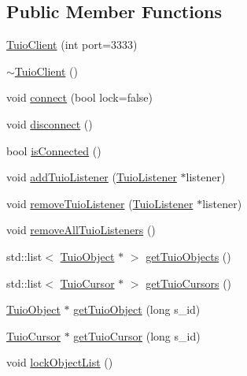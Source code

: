\subsection*{Public Member Functions}
\begin{DoxyCompactItemize}
\item 
\hyperlink{class_t_u_i_o_1_1_tuio_client_a5c270932c095fe9f88caef9a18864cfa}{Tuio\+Client} (int port=3333)
\item 
\hyperlink{class_t_u_i_o_1_1_tuio_client_a8d93ce8f2ed78b1430ac0904adcc1f73}{$\sim$\+Tuio\+Client} ()
\item 
void \hyperlink{class_t_u_i_o_1_1_tuio_client_affe2a075119d66e3047e29a5438c6af5}{connect} (bool lock=false)
\item 
void \hyperlink{class_t_u_i_o_1_1_tuio_client_a4c2291700e637ae6e1ceb55887003500}{disconnect} ()
\item 
bool \hyperlink{class_t_u_i_o_1_1_tuio_client_a6388e3149fd5c0a2da9d6aeeabf7d784}{is\+Connected} ()
\item 
void \hyperlink{class_t_u_i_o_1_1_tuio_client_a5edd6293d13a5e4cc31f734ede575241}{add\+Tuio\+Listener} (\hyperlink{class_t_u_i_o_1_1_tuio_listener}{Tuio\+Listener} $\ast$listener)
\item 
void \hyperlink{class_t_u_i_o_1_1_tuio_client_a0519f60177d5469b2438ca9f86b557fb}{remove\+Tuio\+Listener} (\hyperlink{class_t_u_i_o_1_1_tuio_listener}{Tuio\+Listener} $\ast$listener)
\item 
void \hyperlink{class_t_u_i_o_1_1_tuio_client_ad7fb92acb9a481aadb3620168e44735f}{remove\+All\+Tuio\+Listeners} ()
\item 
std\+::list$<$ \hyperlink{class_t_u_i_o_1_1_tuio_object}{Tuio\+Object} $\ast$ $>$ \hyperlink{class_t_u_i_o_1_1_tuio_client_ad9d968142e2e6d9639b685152ee2cf1b}{get\+Tuio\+Objects} ()
\item 
std\+::list$<$ \hyperlink{class_t_u_i_o_1_1_tuio_cursor}{Tuio\+Cursor} $\ast$ $>$ \hyperlink{class_t_u_i_o_1_1_tuio_client_a8df501baf8e635b931255a17873e590a}{get\+Tuio\+Cursors} ()
\item 
\hyperlink{class_t_u_i_o_1_1_tuio_object}{Tuio\+Object} $\ast$ \hyperlink{class_t_u_i_o_1_1_tuio_client_a11e2341d753f2acfa0c44fe57f63c92c}{get\+Tuio\+Object} (long s\+\_\+id)
\item 
\hyperlink{class_t_u_i_o_1_1_tuio_cursor}{Tuio\+Cursor} $\ast$ \hyperlink{class_t_u_i_o_1_1_tuio_client_a2d8516d662e711d82eb376a7d558ff20}{get\+Tuio\+Cursor} (long s\+\_\+id)
\item 
void \hyperlink{class_t_u_i_o_1_1_tuio_client_ac10760832bf25e758756a17cd9b5d71b}{lock\+Object\+List} ()

\end{DoxyCompactItemize}
